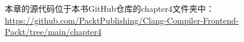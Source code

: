 本章的源代码位于本书GitHub仓库的chapter4文件夹中：
 \url{https://github.com/PacktPublishing/Clang-Compiler-Frontend-Packt/tree/main/chapter4}

